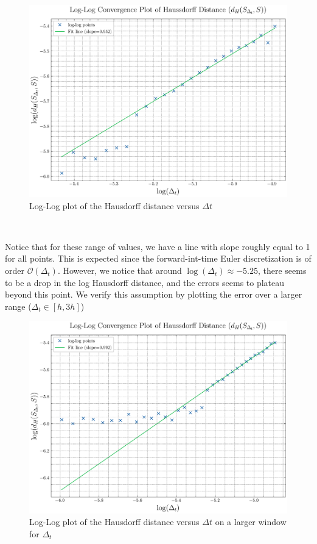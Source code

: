 \documentclass[11pt]{article}
\theoremstyle{definition}
\theoremstyle{remark}
\begin{document}
\begin{figure}[h]
  \centering
  \includegraphics[width=0.7\linewidth]{plots/loglog_plot_convergence_path.png}
  \caption{Log-Log plot of the Hausdorff distance versus $\Delta t$}
  \label{fig:loglog_conv_hausdorff}
\end{figure} \\

\FloatBarrier

\noindent Notice that for these range of values, we have a line with slope roughly equal to 1 for all points. This is expected since the forward-int-time Euler discretization is of order $\mathcal{O}(\Delta_t)$. However, we notice that around $\log(\Delta_t)\approx-5.25$, there seems to be a drop in the log Hausdorff distance, and the errors seems to plateau beyond this point. We verify this assumption by plotting the error over a larger range ($\Delta_t\in[h,3h]$) \\

\begin{figure}[h!]
  \centering
  \includegraphics[width=0.7\linewidth]{plots/loglog_plot_convergence_path_larger_window.png}
  \caption{Log-Log plot of the Hausdorff distance versus $\Delta t$ on a larger window for $\Delta
  _t$}
  \label{fig:loglog_conv_hausdorff}
\end{figure} 
\end{document}
